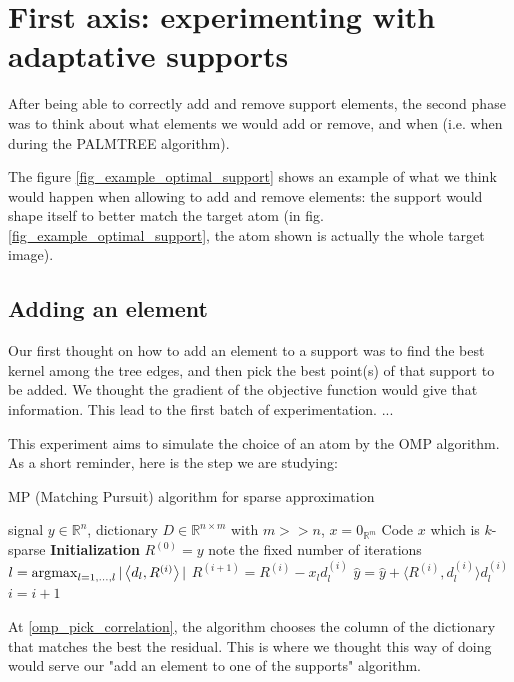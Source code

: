 \section{First axis: experimenting with adaptative supports}

After being able to correctly add and remove support elements, the second phase was to think about what elements we would add or remove, and when (i.e. when during the PALMTREE algorithm).

The figure \ref{fig_example_optimal_support} shows an example of what we think would happen when allowing to add and remove elements: the support would shape itself to better match the target atom (in fig.\ref{fig_example_optimal_support}, the atom shown is actually the whole target image).


\subsection{Adding an element}
Our first thought on how to add an element to a support was to find the best kernel among the tree edges, and then pick the best point(s) of that support to be added. We thought the gradient of the objective function would give that information. This lead to the first batch of experimentation.
...


This experiment aims to simulate the choice of an atom by the OMP algorithm. As a short reminder, here is the step we are studying:
\begin{algorithm} %
    \caption{MP (Matching Pursuit) algorithm for sparse approximation}
  \begin{algorithmic}[0]
    \Input signal $y \in \mathbb{R}^{n}$, dictionary $D \in \mathbb{R}^{n \times m}$ with $m>>n$, $x = 0_{\mathbb{R}^m}$
    \Output Code $x$ which is $k$-sparse
    \State \textbf{Initialization} $R^{(0)} = y$
     \Comment note the fixed number of iterations
      \State $l =  \operatorname*{\arg\!\max}_{l = 1,\dots,l} |\left< d_l,R^{(i)} \right>|$ \label{omp_pick_correlation}
      \State $R^{(i+1)} = R^{(i)}-x_l d_l^{(i)}$
      \State $\hat{y} = \hat{y}+\langle R^{(i)}, d_{l}^{(i)} \rangle d_{l}^{(i)}$
      \State $i = i + 1$
    \EndWhile
  \end{algorithmic}
\end{algorithm}

At \cref{omp_pick_correlation}, the algorithm chooses the column of the dictionary that matches the best the residual. This is where we thought this way of doing would serve our "add an element to one of the supports" algorithm.

